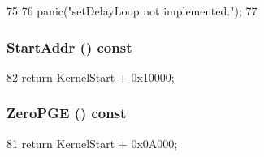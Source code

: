 \begin{DoxyCode}
75 {
76     panic("setDelayLoop not implemented.\n");
77 }
\end{DoxyCode}
\hypertarget{classLinuxMipsSystem_a0cec91dcd0a14397dacd2e083f248ac8}{
\subsubsection[{StartAddr}]{ StartAddr () const}}
\label{classLinuxMipsSystem_a0cec91dcd0a14397dacd2e083f248ac8}



\begin{DoxyCode}
82 { return KernelStart + 0x10000; }
\end{DoxyCode}
\hypertarget{classLinuxMipsSystem_a9a4b640fd69f54b236dfe826a83e99ad}{
\subsubsection[{ZeroPGE}]{ ZeroPGE () const}}
\label{classLinuxMipsSystem_a9a4b640fd69f54b236dfe826a83e99ad}



\begin{DoxyCode}
81 { return KernelStart + 0x0A000; }
\end{DoxyCode}


